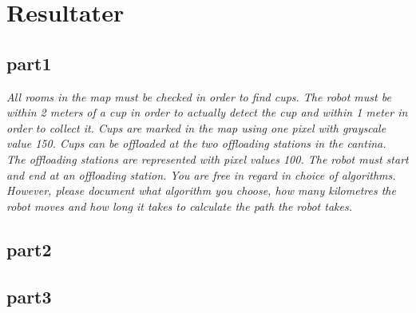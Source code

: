 \section{Resultater}
\label{sec:resultater}

\subsection{part1}


\textit{All rooms in the map must be checked in order to find cups. The robot must be within 2 meters of a cup in order to actually detect the cup and within 1 meter in order to collect it. Cups are marked in the map using one pixel with grayscale value 150. Cups can be offloaded at the two offloading stations in the cantina. The offloading stations are represented with pixel values 100. The robot must start and end at an offloading station.
You are free in regard in choice of algorithms. However, please document what algorithm you choose, how many kilometres the robot moves and how long it takes to calculate the path the robot takes.}






\subsection{part2}
\subsection{part3}